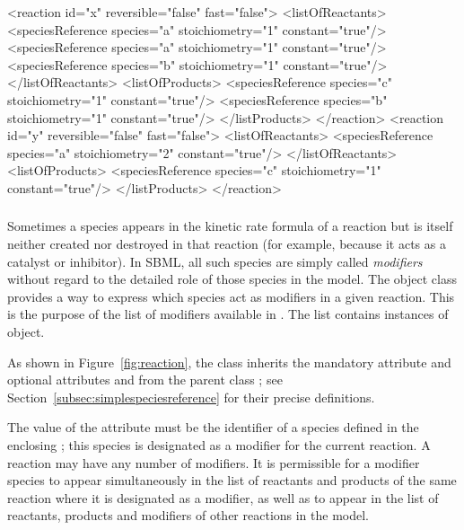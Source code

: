 \begin{example}
<reaction id="x" reversible="false" fast="false">
    <listOfReactants>
        <speciesReference species="a" stoichiometry="1" constant="true"/>
        <speciesReference species="a" stoichiometry="1" constant="true"/>
        <speciesReference species="b" stoichiometry="1" constant="true"/>
    </listOfReactants>
    <listOfProducts>
        <speciesReference species="c" stoichiometry="1" constant="true"/>
        <speciesReference species="b" stoichiometry="1" constant="true"/>
    </listProducts>
</reaction>
<reaction id="y" reversible="false" fast="false">
    <listOfReactants>
        <speciesReference species="a" stoichiometry="2" constant="true"/>
    </listOfReactants>
    <listOfProducts>
        <speciesReference species="c" stoichiometry="1" constant="true"/>
    </listProducts>
</reaction>
\end{example}



\subsubsection{}
\label{subsec:modifierreference}

Sometimes a species appears in the kinetic rate formula of a
reaction but is itself neither created nor destroyed in that
reaction (for example, because it acts as a catalyst or
inhibitor).  In SBML, all such species are simply called
\emph{modifiers} without regard to the detailed role of those
species in the model.  The \Reaction object class provides a way to
express which species act as modifiers in a given reaction.  This
is the purpose of the list of modifiers available in \Reaction.
The list contains instances of \ModifierSpeciesReference
object.

As shown in Figure~\vref{fig:reaction}, the
\ModifierSpeciesReference class inherits the mandatory attribute
 and optional attributes  and 
from the parent class \SimpleSpeciesReference; see
Section~\ref{subsec:simplespeciesreference} for their precise
definitions.

The value of the  attribute must be the identifier of a
species defined in the enclosing \Model; this species is
designated as a modifier for the current reaction.  A reaction may
have any number of modifiers.  It is permissible for a modifier
species to appear simultaneously in the list of reactants and
products of the same reaction where it is designated as a
modifier, as well as to appear in the list of reactants, products
and modifiers of other reactions in the model.

